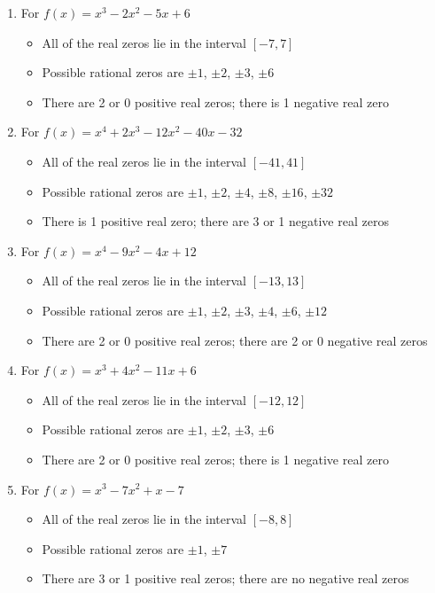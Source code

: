 \begin{enumerate}

\item For $f(x) = x^{3} - 2x^{2} - 5x + 6$
\begin{itemize}
\item  All of the real zeros lie in the interval $[-7,7]$
\item  Possible rational zeros are $\pm 1$, $\pm 2$, $\pm 3$, $\pm 6$
\item  There are 2 or 0 positive real zeros;  there is 1 negative real zero
\end{itemize}

\item For  $f(x) = x^{4} + 2x^{3} - 12x^{2} - 40x - 32$
\begin{itemize}
\item  All of the real zeros lie in the interval $[-41,41]$
\item  Possible rational zeros are $\pm 1$, $\pm 2$, $\pm 4$, $\pm 8$, $\pm 16$, $\pm 32$
\item  There is 1 positive real zero;  there are 3 or 1 negative real zeros
\end{itemize}

\item For  $f(x) = x^{4} - 9x^{2} - 4x + 12$
\begin{itemize}
\item  All of the real zeros lie in the interval $[-13,13]$
\item  Possible rational zeros are $\pm 1$, $\pm 2$, $\pm 3$, $\pm 4$, $\pm 6$, $\pm 12$
\item  There are 2 or 0 positive real zeros;  there are 2 or 0 negative real zeros
\end{itemize}

\item For  $f(x) = x^{3} + 4x^{2} - 11x + 6$
\begin{itemize}
\item  All of the real zeros lie in the interval $[-12,12]$
\item  Possible rational zeros are $\pm 1$, $\pm 2$, $\pm 3$, $\pm 6$
\item  There are 2 or 0 positive real zeros;  there is 1 negative real zero
\end{itemize}

\item For   $f(x) = x^{3} - 7x^{2} + x - 7$
\begin{itemize}
\item  All of the real zeros lie in the interval $[-8,8]$
\item  Possible rational zeros are $\pm 1$, $\pm 7$
\item  There are 3 or 1 positive real zeros;  there are no negative real zeros
\end{itemize}


\end{enumerate}
